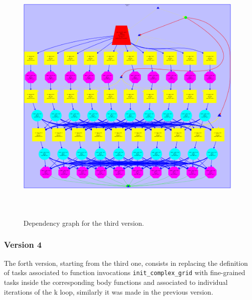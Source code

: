 \documentclass[12]{article}
\begin{document}
\begin{figure}[H]
\centering  \includegraphics[width=\linewidth , height=13cm, width=13cm  ]{dependency_graph3.png}
  \caption{Dependency graph for the third version.}
  \label{fig:Depencency3rd}
\end{figure}

\subsubsection{Version 4}
The forth version, starting from the third one, consists in replacing the definition of tasks associated to function invocations \texttt{init\_complex\_grid}  with fine-grained tasks inside the corresponding body functions and associated to individual iterations of the k loop, similarly it was made in the previous version. 
\end{document}
